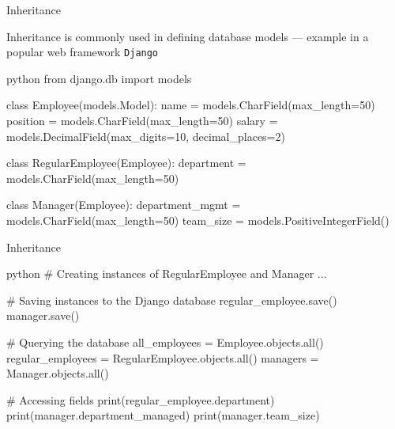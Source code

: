 \documentclass[
	11pt, 
]{beamer}
\begin{document}

\begin{frame}[fragile]{Inheritance}

Inheritance is commonly used in defining database models --- example in a popular web framework \texttt{Django}  

\begin{mintedbox}{python}
from django.db import models

class Employee(models.Model):
    name = models.CharField(max_length=50)
    position = models.CharField(max_length=50)
    salary = models.DecimalField(max_digits=10, decimal_places=2)

class RegularEmployee(Employee):
    department = models.CharField(max_length=50)

class Manager(Employee):
    department_mgmt = models.CharField(max_length=50)
    team_size = models.PositiveIntegerField()
\end{mintedbox}
\end{frame}


\begin{frame}[fragile]{Inheritance}

\begin{mintedbox}{python}
# Creating instances of RegularEmployee and Manager
...

# Saving instances to the Django database
regular_employee.save()
manager.save()

# Querying the database
all_employees = Employee.objects.all()
regular_employees = RegularEmployee.objects.all()
managers = Manager.objects.all()

# Accessing fields
print(regular_employee.department)
print(manager.department_managed)
print(manager.team_size)
\end{mintedbox}
\end{frame}

\end{document}

